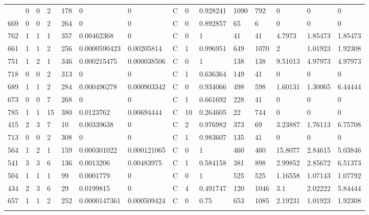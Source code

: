 \begin{latin}
\begin{longtable}{lllllllllllllll}
\begin{comment}
	583 & 0  & 0   & 2  & 178 & 0              & 0              & C & 0  & 0.928241 & 1090 & 792  & 0       & 0       & 0       \\
	669 & 0  & 0   & 2  & 264 & 0              & 0              & C & 0  & 0.892857 & 65   & 6    & 0       & 0       & 0       \\
	762 & 1  & 1   & 1  & 357 & 0.00462368     & 0              & C & 0  & 1        & 41   & 41   & 4.7973  & 1.85473 & 1.85473 \\
	661 & 1  & 1   & 2  & 256 & 0.0000590423   & 0.00205814     & C & 1  & 0.996951 & 649  & 1070 & 2       & 1.01923 & 1.92308 \\
	751 & 1  & 2   & 1  & 346 & 0.000215475    & 0.000038506    & C & 0  & 1        & 138  & 138  & 9.51013 & 4.97973 & 4.97973 \\
	718 & 0  & 0   & 2  & 313 & 0              & 0              & C & 1  & 0.636364 & 149  & 41   & 0       & 0       & 0       \\
	689 & 1  & 1   & 2  & 284 & 0.000496278    & 0.000903342    & C & 0  & 0.934066 & 498  & 598  & 1.60131 & 1.30065 & 6.44444 \\
	673 & 0  & 0   & 7  & 268 & 0              & 0              & C & 1  & 0.661692 & 228  & 41   & 0       & 0       & 0       \\
	785 & 1  & 1   & 15 & 380 & 0.0123762      & 0.00694444     & C & 10 & 0.264605 & 22   & 744  & 0       & 0       & 0       \\
	415 & 2  & 3   & 7  & 10  & 0.00339638     & 0              & C & 2  & 0.976982 & 373  & 69   & 3.23887 & 1.76113 & 6.75708 \\
	713 & 0  & 0   & 2  & 308 & 0              & 0              & C & 1  & 0.983607 & 135  & 41   & 0       & 0       & 0       \\
	564 & 1  & 2   & 1  & 159 & 0.000301022    & 0.000121065    & C & 0  & 1        & 460  & 460  & 15.8077 & 2.84615 & 5.03846 \\
	541 & 3  & 3   & 6  & 136 & 0.0013206      & 0.00483975     & C & 1  & 0.584158 & 381  & 898  & 2.99852 & 2.85672 & 6.51373 \\
	504 & 1  & 1   & 1  & 99  & 0.0001779      & 0              & C & 0  & 1        & 525  & 525  & 1.16558 & 1.07143 & 1.07792 \\
	434 & 2  & 3   & 6  & 29  & 0.0199815      & 0              & C & 4  & 0.491747 & 120  & 1046 & 3.1     & 2.02222 & 5.84444 \\
	657 & 1  & 1   & 2  & 252 & 0.0000147361   & 0.000509424    & C & 0  & 0.75     & 653  & 1085 & 2.19231 & 1.01923 & 1.92308 \\

\end{comment}
\end{longtable}
\end{latin}
